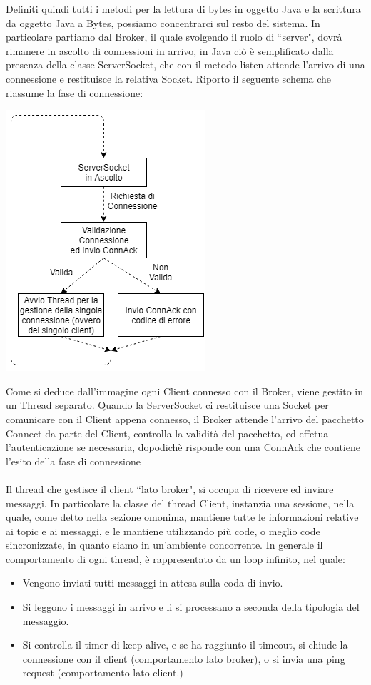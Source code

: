 \documentclass{article}
\begin{document}
Definiti quindi tutti i metodi per la lettura di bytes in oggetto Java e la scrittura da oggetto Java a Bytes, possiamo concentrarci sul resto del sistema. In particolare partiamo dal Broker, il quale svolgendo il ruolo di ``server", dovrà rimanere in ascolto di connessioni in arrivo, in Java ciò è semplificato dalla presenza della classe ServerSocket, che con il metodo listen attende l'arrivo di una connessione e restituisce la relativa Socket. Riporto il seguente schema che riassume la fase di connessione:

\begin{center}
	\includegraphics[scale=0.6]{immagini/serversocket.png}
\end{center}
Come si deduce dall'immagine ogni Client connesso con il Broker, viene gestito in un Thread separato. Quando la ServerSocket ci restituisce una Socket per comunicare con il Client appena connesso, il Broker attende l'arrivo del pacchetto Connect da parte del Client, controlla la validità del pacchetto, ed effetua l'autenticazione se necessaria, dopodichè risponde con una ConnAck che contiene l'esito della fase di connessione\\\\Il thread che gestisce il client ``lato broker", si occupa di ricevere ed inviare messaggi. In particolare la classe del thread Client, instanzia una sessione, nella quale, come detto nella sezione omonima, mantiene tutte le informazioni relative ai topic e ai messaggi, e le mantiene utilizzando più code, o meglio code sincronizzate, in quanto siamo in un'ambiente concorrente. In generale il comportamento di ogni thread, è rappresentato da un loop infinito, nel quale:
\begin{itemize}
	\item Vengono inviati tutti messaggi in attesa sulla coda di invio.
	\item Si leggono i messaggi in arrivo e li si processano a seconda della tipologia del messaggio.
	\item Si controlla il timer di keep alive, e se ha raggiunto il timeout, si chiude la connessione con il client (comportamento lato broker), o si invia una ping request (comportamento lato client.)
\end{itemize}
\end{document}
